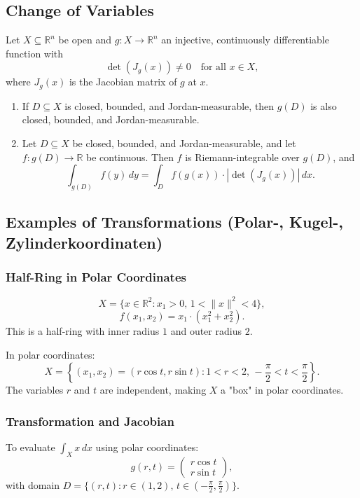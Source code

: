 \documentclass{article}
\begin{document}
\subsection{Change of Variables}
    Let \( X \subseteq \mathbb{R}^n \) be open and \( g : X \to \mathbb{R}^n \) an injective, continuously differentiable function with  
    \[ \det(J_g(x)) \neq 0 \quad \text{for all } x \in X, \]  
    where \( J_g(x) \) is the Jacobian matrix of \( g \) at \( x \).
    
    \begin{enumerate}[label=(\arabic*)]
        \item If \( D \subseteq X \) is closed, bounded, and Jordan-measurable, then \( g(D) \) is also closed, bounded, and Jordan-measurable.
        
        \item Let \( D \subseteq X \) be closed, bounded, and Jordan-measurable, and let \( f : g(D) \to \mathbb{R} \) be continuous. Then \( f \) is Riemann-integrable over \( g(D) \), and  
        \[ \int_{g(D)} f(y) \, dy = \int_{D} f(g(x)) \cdot |\det(J_g(x))| \, dx. \]
    \end{enumerate}

    
    \subsection*{Examples of Transformations (Polar-, Kugel-, Zylinderkoordinaten)}
    
    \subsubsection{Half-Ring in Polar Coordinates}
    \[ X = \{x \in \mathbb{R}^2 : x_1 > 0, \, 1 < \|x\|^2 < 4\}, \]  
    \[ f(x_1, x_2) = x_1 \cdot (x_1^2 + x_2^2). \]  
    This is a half-ring with inner radius \( 1 \) and outer radius \( 2 \).  
    
    In polar coordinates:  
    \[ X = \left\{ (x_1, x_2) = (r \cos t, r \sin t) : 1 < r < 2, \, -\frac{\pi}{2} < t < \frac{\pi}{2} \right\}. \]  
    The variables \( r \) and \( t \) are independent, making \( X \) a "box" in polar coordinates.
    
    \subsubsection{Transformation and Jacobian}
    To evaluate \( \int_X x \, dx \) using polar coordinates:  
    \[ g(r, t) = \begin{pmatrix} r \cos t \\ r \sin t \end{pmatrix}, \]  
    with domain \( D = \{(r, t) : r \in (1, 2), \, t \in (-\frac{\pi}{2}, \frac{\pi}{2})\} \).  
    
\end{document}
